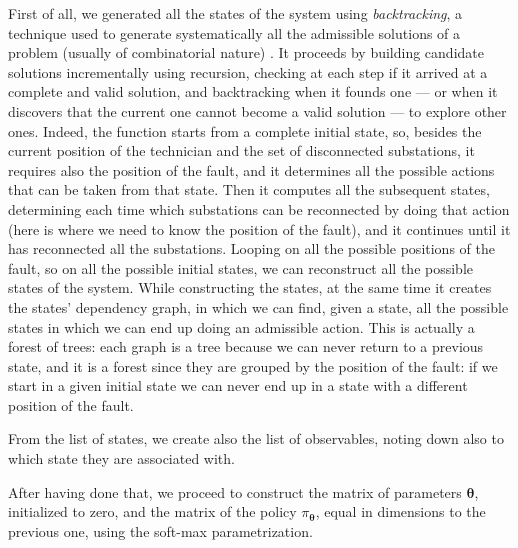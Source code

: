 First of all, we generated all the states of the system using \emph{backtracking}, a technique used to generate systematically all the admissible solutions of a problem (usually of combinatorial nature) \cite{Montresor2014}. It proceeds by building candidate solutions incrementally using recursion, checking at each step if it arrived at a complete and valid solution, and backtracking when it founds one --- or when it discovers that the current one cannot become a valid solution --- to explore other ones. Indeed, the function starts from a complete initial state, so, besides the current position of the technician and the set of disconnected substations, it requires also the position of the fault, and it determines all the possible actions that can be taken from that state. Then it computes all the subsequent states, determining each time which substations can be reconnected by doing that action (here is where we need to know the position of the fault), and it continues until it has reconnected all the substations. Looping on all the possible positions of the fault, so on all the possible initial states, we can reconstruct all the possible states of the system. While constructing the states, at the same time it creates the states' dependency graph, in which we can find, given a state, all the possible states in which we can end up doing an admissible action. This is actually a forest of trees: each graph is a tree because we can never return to a previous state, and it is a forest since they are grouped by the position of the fault: if we start in a given initial state we can never end up in a state with a different position of the fault.

From the list of states, we create also the list of observables, noting down also to which state they are associated with.

After having done that, we proceed to construct the matrix of parameters $\boldsymbol \theta$, initialized to zero, and the matrix of the policy $\pi_{\boldsymbol \theta}$, equal in dimensions to the previous one, using the soft-max parametrization.

